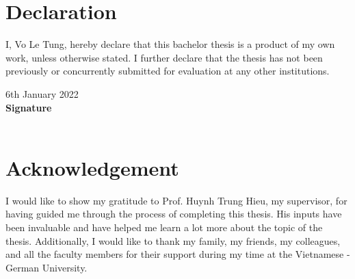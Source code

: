 \documentclass[a4paper,11pt]{report}
\begin{document}
\chapter*{Declaration}
I, Vo Le Tung, hereby declare that this bachelor thesis is a product of my own work, unless otherwise stated.
I further declare that the thesis has not been previously or concurrently submitted for evaluation at any other institutions.

\vspace{1cm}
\noindent 6th January 2022\\
\textbf{Signature}
\vspace{3cm}\\
\underline{\hspace{5cm}}\\

\chapter*{Acknowledgement}
I would like to show my gratitude to Prof. Huynh Trung Hieu, my supervisor, for having guided me through the process of completing this thesis.
His inputs have been invaluable and have helped me learn a lot more about the topic of the thesis.
Additionally, I would like to thank my family, my friends, my colleagues, and all the faculty members for their support during my time at the Vietnamese - German University.
\tableofcontents

\listoffigures

\listoftables

\newpage
{}













\printbibliography[title=References]



\printglossaries
\end{document}
